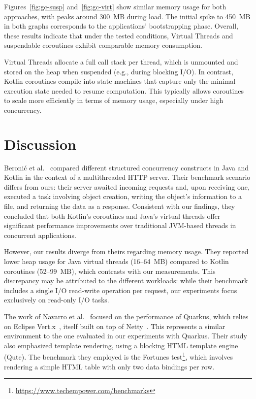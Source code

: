 Figures~\ref{fig:gc-susp} and~\ref{fig:gc-virt} show similar memory usage for
both approaches, with peaks around 300~MB during load. The initial spike to
450~MB in both graphs corresponds to the applications' bootstrapping phase.
Overall, these results indicate that under the tested conditions, Virtual
Threads and suspendable coroutines exhibit comparable memory consumption.

Virtual Threads allocate a full call stack per thread, which is unmounted and
stored on the heap when suspended (e.g., during blocking I/O). In contrast,
Kotlin coroutines compile into state machines that capture only the minimal
execution state needed to resume computation. This typically allows coroutines
to scale more efficiently in terms of memory usage, especially under high
concurrency. 

\section{Discussion}

Beronić et al.~\cite{9803765} compared different structured concurrency constructs 
in Java and Kotlin in the context of a multithreaded HTTP server. 
Their benchmark scenario differs from ours: their server awaited incoming requests 
and, upon receiving one, executed a task involving object creation, writing the 
object's information to a file, and returning the data as a response.
Consistent with our findings, they concluded that both Kotlin's coroutines and 
Java's virtual threads offer significant performance improvements over traditional 
JVM-based threads in concurrent applications.

However, our results diverge from theirs regarding memory usage. 
They reported lower heap usage for Java virtual threads (16–64~MB) compared to 
Kotlin coroutines (52–99~MB), which contrasts with our measurements. 
This discrepancy may be attributed to the different workloads: while their 
benchmark includes a single I/O read-write operation per request, our experiments 
focus exclusively on read-only I/O tasks.

The work of Navarro et al.~\cite{navarro2023considerations} focused on the
performance of Quarkus, which relies on Eclipse Vert.x~\cite{vertx}, itself
built on top of Netty~\cite{netty}. 
This represents a similar environment to the one evaluated in our experiments
with Quarkus. 
Their study also emphasized template rendering, using a blocking HTML template
engine (Qute). 
The benchmark they employed is the Fortunes
test\footnote{\url{https://www.techempower.com/benchmarks}}, which involves
rendering a simple HTML table with only two data bindings per row.

